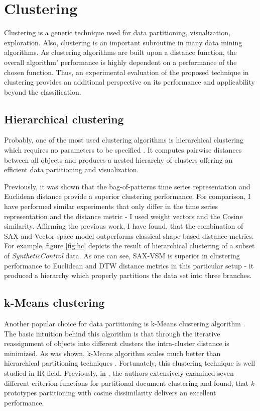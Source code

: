 \section{Clustering}
Clustering is a generic technique used for data partitioning, visualization, exploration.
Also, clustering is an important subroutine in many data mining algorithms.
As clustering algorithms are built upon a distance function, the overall algorithm' performance is highly 
dependent on a performance of the chosen function. 
Thus, an experimental evaluation of the proposed technique in clustering provides an additional perspective 
on its performance and applicability beyond the classification.

\subsection{Hierarchical clustering}
Probably, one of the most used clustering algorithms is hierarchical clustering which requires no
parameters to be specified \cite{citeulike:1576606}. It computes pairwise distances between all objects and 
produces a nested hierarchy of clusters offering an efficient data partitioning and visualization. 

Previously, it was shown that the bag-of-patterns time series representation and Euclidean distance
provide a superior clustering performance\cite{citeulike:10525778}. 
For comparison, I have performed similar experiments that only differ in the time series representation and
the distance metric - I used \tfidf weight vectors and the Cosine similarity. 
Affirming the previous work, I have found, that the combination of SAX and Vector space model outperforms 
classical shape-based distance metrics. 
For example, figure \ref{fig:hc} depicts the result of hierarchical clustering of a subset of
\textit{SyntheticControl} data. 
As one can see, SAX-VSM is superior in clustering performance to Euclidean and DTW distance 
metrics in this particular setup - it produced a hierarchy which properly partitions the
data set into three branches.

\subsection{k-Means clustering}
Another popular choice for data partitioning is k-Means clustering algorithm \cite{kmeans}.
The basic intuition behind this algorithm is that through the iterative reassignment of objects 
into different clusters the intra-cluster distance is minimized. As was shown, k-Means 
algorithm scales much better than hierarchical partitioning techniques \cite{citeulike:4195343}.
Fortunately, this clustering technique is well studied in IR field. Previously, in \cite{citeulike:505248}, the
authors extensively examined seven different criterion functions for partitional document
clustering and found, that \textit{k}-prototypes partitioning with cosine dissimilarity delivers an
excellent performance. 

